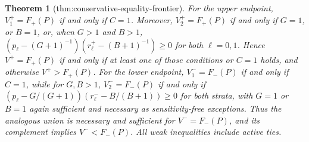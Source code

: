 \documentclass{article}
\newtheorem{theorem}{Theorem}
\begin{document}
\begin{theorem}[thm:conservative-equality-frontier]\label{thm:conservative-equality-frontier}
For the upper endpoint, \(V_1^+=F_+(P)\) if and only if \(C=1\). Moreover, \(V_2^+=F_+(P)\) if and only if \(G=1\), or \(B=1\), or, when \(G>1\) and \(B>1\), \((p_\ell-(G+1)^{-1})(r_\ell^+-(B+1)^{-1})\geq0\) for both \(\ell=0,1\). Hence \(V^+=F_+(P)\) if and only if at least one of those conditions or \(C=1\) holds, and otherwise \(V^+>F_+(P)\). For the lower endpoint, \(V_1^-=F_-(P)\) if and only if \(C=1\), while for \(G,B>1\), \(V_2^-=F_-(P)\) if and only if \((p_\ell-G/(G+1))(r_\ell^--B/(B+1))\geq0\) for both strata, with \(G=1\) or \(B=1\) again sufficient and necessary as sensitivity-free exceptions. Thus the analogous union is necessary and sufficient for \(V^-=F_-(P)\), and its complement implies \(V^-<F_-(P)\). All weak inequalities include active ties.
\end{theorem}
\end{document}
